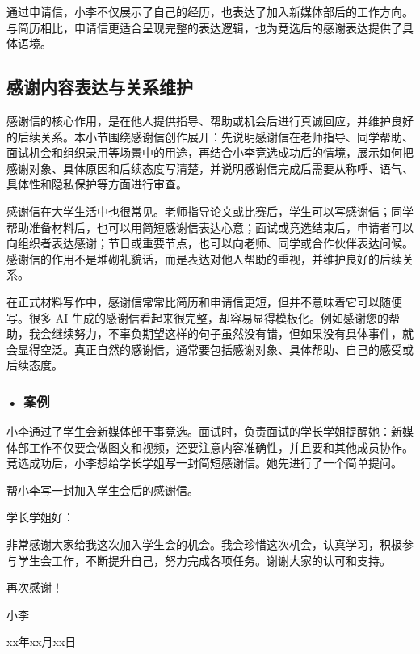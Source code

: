 通过申请信，小李不仅展示了自己的经历，也表达了加入新媒体部后的工作方向。与简历相比，申请信更适合呈现完整的表达逻辑，也为竞选后的感谢表达提供了具体语境。


\subsection{感谢内容表达与关系维护}

感谢信的核心作用，是在他人提供指导、帮助或机会后进行真诚回应，并维护良好的后续关系。本小节围绕感谢信创作展开：先说明感谢信在老师指导、同学帮助、面试机会和组织录用等场景中的用途，再结合小李竞选成功后的情境，展示如何把感谢对象、具体原因和后续态度写清楚，并说明感谢信完成后需要从称呼、语气、具体性和隐私保护等方面进行审查。

感谢信在大学生活中也很常见。老师指导论文或比赛后，学生可以写感谢信；同学帮助准备材料后，也可以用简短感谢信表达心意；面试或竞选结束后，申请者可以向组织者表达感谢；节日或重要节点，也可以向老师、同学或合作伙伴表达问候。感谢信的作用不是堆砌礼貌话，而是表达对他人帮助的重视，并维护良好的后续关系。

在正式材料写作中，感谢信常常比简历和申请信更短，但并不意味着它可以随便写。很多 AI 生成的感谢信看起来很完整，却容易显得模板化。例如感谢您的帮助，我会继续努力，不辜负期望这样的句子虽然没有错，但如果没有具体事件，就会显得空泛。真正自然的感谢信，通常要包括感谢对象、具体帮助、自己的感受或后续态度。

\subsubsection*{\textbf{• 案例}}

小李通过了学生会新媒体部干事竞选。面试时，负责面试的学长学姐提醒她：新媒体部工作不仅要会做图文和视频，还要注意内容准确性，并且要和其他成员协作。竞选成功后，小李想给学长学姐写一封简短感谢信。她先进行了一个简单提问。

\begin{userbox}
帮小李写一封加入学生会后的感谢信。
\end{userbox}

\begin{aibox}
\noindent 学长学姐好：

\par\qquad 非常感谢大家给我这次加入学生会的机会。我会珍惜这次机会，认真学习，积极参与学生会工作，不断提升自己，努力完成各项任务。谢谢大家的认可和支持。

\par\qquad 再次感谢！

\par\hfill 小李

\par\hfill xx年xx月xx日
\end{aibox}

